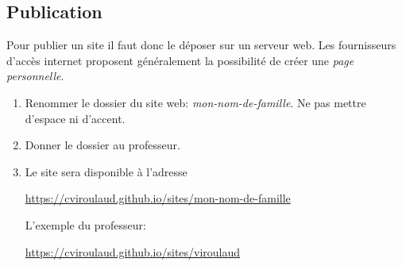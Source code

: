 \documentclass[a4paper,11pt]{article}
\begin{document}
\begin{Form}
\section{Publication}
Pour publier un site il faut donc le déposer sur un serveur web. Les fournisseurs d'accès internet proposent généralement la possibilité de créer une \emph{page personnelle}.
\begin{activite}
\begin{enumerate}
\item Renommer le dossier du site web: \emph{mon-nom-de-famille}. Ne pas mettre d'espace ni d'accent.
\item Donner le dossier au professeur.
\item Le site sera disponible à l'adresse 
\begin{center}
\url{https://cviroulaud.github.io/sites/mon-nom-de-famille}
\end{center}
L'exemple du professeur:
\begin{center}
\url{https://cviroulaud.github.io/sites/viroulaud}
\end{center}
\end{enumerate}
\end{activite}
\end{Form}
\end{document}
